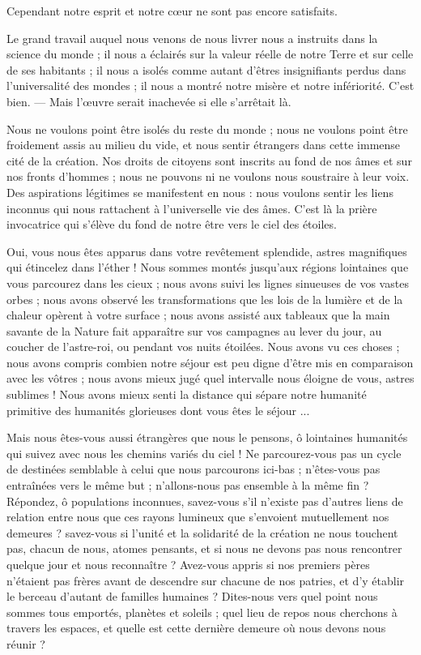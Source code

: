 \documentclass[a4paper, 11pt, oneside, landscape]{article}
\begin{document}
Cependant notre esprit et notre cœur ne sont pas encore satisfaits.

Le grand travail auquel nous venons de nous livrer nous a instruits dans la science du monde ; il nous a éclairés sur la valeur réelle de notre Terre et sur celle de ses habitants ; il nous a isolés comme autant d'êtres insignifiants perdus dans l'universalité des mondes ; il nous a montré notre misère et notre infériorité. C'est bien. --- Mais l'œuvre serait inachevée si elle s'arrêtait là.

Nous ne voulons point être isolés du reste du monde ; nous ne voulons point être froidement assis au milieu du vide, et nous sentir étrangers dans cette immense cité de la création. Nos droits de citoyens sont inscrits au fond de nos âmes et sur nos fronts d'hommes ; nous ne pouvons ni ne voulons nous soustraire à leur voix. Des aspirations légitimes se manifestent en nous : nous voulons sentir les liens inconnus qui nous rattachent à l'universelle vie des âmes. C'est là la prière invocatrice qui s'élève du fond de notre être vers le ciel des étoiles.

Oui, vous nous êtes apparus dans votre revêtement splendide, astres magnifiques qui étincelez dans l'éther ! Nous sommes montés jusqu'aux régions lointaines que vous parcourez dans les cieux ; nous avons suivi les lignes sinueuses de vos vastes orbes ; nous avons observé les transformations que les lois de la lumière et de la chaleur opèrent à votre surface ; nous avons assisté aux tableaux que la main savante de la Nature fait apparaître sur vos campagnes au lever du jour, au coucher de l'astre-roi, ou pendant vos nuits étoilées. Nous avons vu ces choses ; nous avons compris combien notre séjour est peu digne d'être mis en comparaison avec les vôtres ; nous avons mieux jugé quel intervalle nous éloigne de vous, astres sublimes ! Nous avons mieux senti la distance qui sépare notre humanité primitive des humanités glorieuses dont vous êtes le séjour ...

Mais nous êtes-vous aussi étrangères que nous le pensons, ô lointaines humanités qui suivez avec nous les chemins variés du ciel ! Ne parcourez-vous pas un cycle de destinées semblable à celui que nous parcourons ici-bas ; n'êtes-vous pas entraînées vers le même but ; n'allons-nous pas ensemble à la même fin ? Répondez, ô populations inconnues, savez-vous s'il n'existe pas d'autres liens de relation entre nous que ces rayons lumineux que s'envoient mutuellement nos demeures ? savez-vous si l'unité et la solidarité de la création ne nous touchent pas, chacun de nous, atomes pensants, et si nous ne devons pas nous rencontrer quelque jour et nous reconnaître ? Avez-vous appris si nos premiers pères n'étaient pas frères avant de descendre sur chacune de nos patries, et d'y établir le berceau d'autant de familles humaines ? Dites-nous vers quel point nous sommes tous emportés, planètes et soleils ; quel lieu de repos nous cherchons à travers les espaces, et quelle est cette dernière demeure où nous devons nous réunir ?
\end{document}
